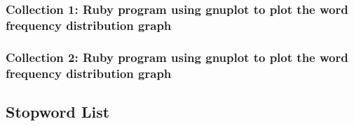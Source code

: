 \subsubsection{Collection 1: Ruby program using gnuplot to plot the word frequency distribution graph}

\newpage

\subsubsection{Collection 2: Ruby program using gnuplot to plot the word frequency distribution graph}


\newpage

\subsection{Stopword List}
\begingroup
\obeylines

\endgroup

